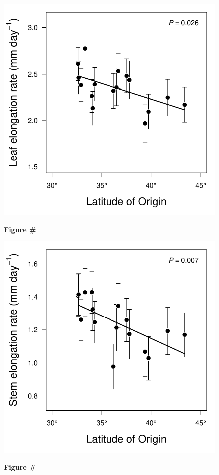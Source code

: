 \documentclass[11pt, oneside]{article}
\begin{document}
\begin{figure}
\centerline{\includegraphics[width=1\textwidth]{Figures/Figure_LLL_Lat.pdf}}
\label{fig:Fig1}
\fontsize{10}{12}
\selectfont
\textbf{Figure \#} 
\end{figure}

\begin{figure}
\centerline{\includegraphics[width=1\textwidth]{Figures/Figure_Height_Lat.pdf}}
\label{fig:Fig1}
\fontsize{10}{12}
\selectfont
\textbf{Figure \#} 
\end{figure}


\setlength{\bibsep}{6pt}
\bigskip



\end{document}
